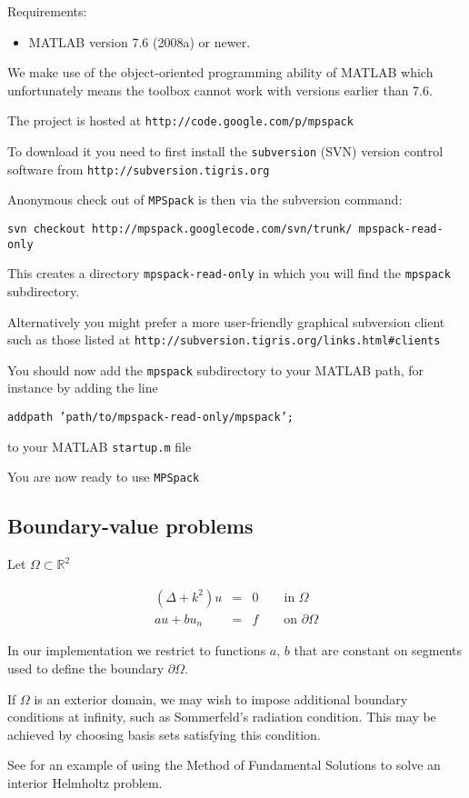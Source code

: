 \documentclass[12pt]{article}
\newcommand{\bi}{\begin{itemize}}
\newcommand{\ei}{\end{itemize}}
\newcommand{\bea}{\begin{eqnarray}}
\newcommand{\eea}{\end{eqnarray}}
\newcommand{\pO}{{\partial\Omega}}
\begin{document}
Requirements:
\bi
\item MATLAB version 7.6 (2008a) or newer.
\ei

We make use of the object-oriented programming ability of MATLAB which
unfortunately means the toolbox cannot work with versions earlier than 7.6.


The project is hosted at
{\tt http://code.google.com/p/mpspack}

To download it you need to first install the {\tt subversion} (SVN) version
control software from {\tt http://subversion.tigris.org}

Anonymous check out of {\tt MPSpack} is then via the subversion command:

{\tt svn checkout http://mpspack.googlecode.com/svn/trunk/ mpspack-read-only}

This creates a directory {\tt mpspack-read-only} in which you will find
the {\tt mpspack} subdirectory.

Alternatively you might prefer a more user-friendly graphical
subversion client such as those listed at 
{\tt http://subversion.tigris.org/links.html\#clients}

You should now add the {\tt mpspack}
subdirectory to your MATLAB path, for instance by adding the line

{\tt addpath 'path/to/mpspack-read-only/mpspack';}

to your MATLAB {\tt startup.m} file

You are now ready to use {\tt MPSpack}


\subsection{Boundary-value problems}

Let $\Omega \subset \mathbb{R}^2$

\bea
(\Delta+k^2)u& =& 0 \qquad \mbox{in } \Omega\\
au + b u_n&=&f\qquad \mbox{on } \pO
\eea

In our implementation we restrict to functions $a$, $b$ that are
constant on segments used to define the boundary $\pO$.

If $\Omega$ is an exterior domain, we may wish to impose
additional boundary conditions at infinity, such as Sommerfeld's
radiation condition.
This may be achieved by choosing basis sets satisfying this condition.

See \cite{mfs} for
an example of using the Method of Fundamental Solutions to solve
an interior Helmholtz problem.
\end{document}
